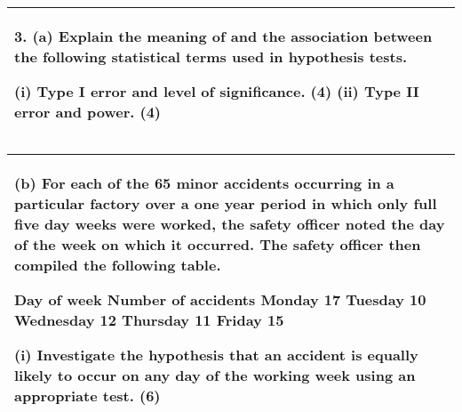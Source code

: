 \documentclass[a4paper,12pt]{article}
\begin{document}
  \begin{table}[ht!]
     \centering
     \begin{tabular}{|p{15cm}|}
     \hline        
3. (a) Explain the meaning of and the association between the following statistical terms used in hypothesis tests. 
 
  (i) Type I error and level of significance. 
(4) 
  (ii) Type II error and power. 
(4) 
 

\\ \hline
      \end{tabular}
    \end{table}
    
  \begin{table}[ht!]
     \centering
     \begin{tabular}{|p{15cm}|}
     \hline  
 (b) For each of the 65 minor accidents occurring in a particular factory over a one year period in which only full five day weeks were worked, the safety officer noted the day of the week on which it occurred.  The safety officer then compiled the following table. 
 
Day of week Number of accidents Monday 17 Tuesday 10 Wednesday 12 Thursday 11 Friday 15 
 
 
 (i) Investigate the hypothesis that an accident is equally likely to occur on any day of the working week using an appropriate test. (6) 
 
   
 \\ \hline 
      \end{tabular}
    \end{table}
  

\begin{table}[]
\centering
{}
\end{table}        
\end{document}
